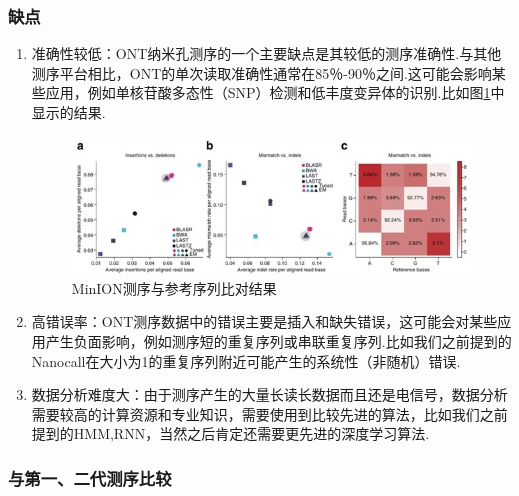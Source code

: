 \subsubsection{缺点}

\begin{enumerate}
	
	\item 准确性较低：ONT纳米孔测序的一个主要缺点是其较低的测序准确性.与其他测序平台相比，ONT的单次读取准确性通常在85％-90％之间.这可能会影响某些应用，例如单核苷酸多态性（SNP）检测和低丰度变异体的识别.比如图\ref{miss}中显示的结果.
	
	\begin{figure}[htp!]
		\centering
		\includegraphics[width=1\linewidth]{figure/miss}
		\caption{MinION测序与参考序列比对结果\cite{2jain2016oxford}} \label{miss}
	\end{figure}
	
	\item 高错误率：ONT测序数据中的错误主要是插入和缺失错误，这可能会对某些应用产生负面影响，例如测序短的重复序列或串联重复序列.比如我们之前提到的Nanocall\cite{david2017nanocall}在大小为1的重复序列附近可能产生的系统性（非随机）错误.
	
	
	\item 数据分析难度大：由于测序产生的大量长读长数据而且还是电信号，数据分析需要较高的计算资源和专业知识，需要使用到比较先进的算法，比如我们之前提到的HMM,RNN，当然之后肯定还需要更先进的深度学习算法.
\end{enumerate}

\subsubsection{与第一、二代测序比较}


